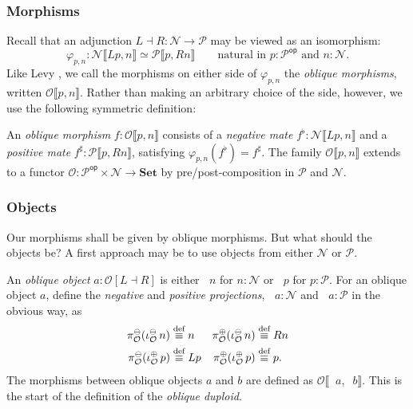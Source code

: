 \documentclass[runningheads]{llncs}
\newcommand*\rocqlogo{\usebox{\rocqlogobox}}
\newcommand{\lemmaref}[3]{\href{https://github.com/UniMath/UniMath/blob/94fae0eda57a778cec704bfa73b4ff525c9bc475/#1\#L#2?name=#3}{\rocqlogo}}
\newcommand{\acat}[1]{\mathcal{#1}}
\newcommand{\PP}{\acat{P}}
\newcommand{\NN}{\acat{N}}
\newcommand{\OO}{\acat{O}}
\newcommand{\wkcat}[1]{\mathbf{#1}}
\newcommand{\Setcat}{\wkcat{Set}}
\newcommand{\Obl}[1]{\OO[#1]}
\newcommand{\op}{{\mathsf{op}}}
\newcommand{\morsof}[3]{{#1}\llbracket{#2},{#3}\rrbracket}
\newcommand{\defequiv}{\overset{\mathrm{\textup{def}}}{\equiv}}
\newcommand{\innegO}{\mathop{\iota^{\ominus}_{\OO}}}
\newcommand{\inposO}{\mathop{\iota^{\oplus}_{\OO}}}
\newcommand{\projnegO}{\mathop{\pi^{\ominus}_{\OO}}}
\newcommand{\projposO}{\mathop{\pi^{\oplus}_{\OO}}}
\begin{document}
\subsubsection*{Morphisms}
\label{sec:morphisms}
Recall that an adjunction \(L \dashv R : \NN \to \PP\) may be
viewed as an isomorphism:
\begin{equation*}
\varphi_{p,n} : \morsof\NN{Lp}{n} \simeq \morsof\PP{p}{Rn}
\qquad \text{natural in \(p : \PP^\op\) and \(n : \NN\).} \label{eq:nathomweq}
\end{equation*}
Like Levy \cite{Levy03b}, we call the morphisms on either side of
\(\varphi_{p,n}\) the \emph{oblique morphisms}, written
\(\morsof\OO{p}{n}\). Rather than making an arbitrary choice of the
side, however, we use the following symmetric definition:

\begin{definition}[{\lemmaref{UniMath/CategoryTheory/Nonassociative/Duploids/FromAdjunction/ObliqueMor.v}{46}{oblique\_mor}}]
\label{def:obliquemor}
An \emph{oblique morphism} \(f : \morsof\OO{p}{n}\) consists of a \emph{negative
mate} \(f^\flat : \morsof{\NN}{Lp}{n}\) and a \emph{positive mate}
\(f^\sharp : \morsof{\PP}{p}{Rn}\), satisfying
\(\varphi_{p,n}(f^\flat) = f^\sharp\). The family \(\morsof\OO{p}{n}\)
extends to a functor \(\OO : \PP^\op \times \NN \to \Setcat\) by
pre/post\hyp{}composition in \(\PP\) and \(\NN\).
\end{definition}
\subsubsection*{Objects}
\label{sec:objects}
Our morphisms shall be given by oblique morphisms. But what should the
objects be? A first approach may be to use objects from either \(\NN\)
or \(\PP\).

\begin{definition}[{\lemmaref{UniMath/CategoryTheory/Nonassociative/Duploids/FromAdjunction/Oblique.v}{58}{oblique\_ob}}]
\label{def:oblique-ob}
An \emph{oblique object} \(a : \Obl{L \dashv R}\) is either \(\innegO{n}\)
for \(n : \NN\) or \(\inposO{p}\) for \(p : \PP\). For an oblique
object \(a\), define the \emph{negative} and \emph{positive projections},
\(\projnegO{a} : \NN\) and \(\projposO{a} : \PP\) in the obvious way,
as
\begin{align*}
  \projnegO(\innegO{n}) &\defequiv n & \projposO(\innegO{n}) &\defequiv Rn \\
  \projnegO(\inposO{p}) &\defequiv Lp & \projposO(\inposO{p}) &\defequiv p\mathpunct.
\end{align*}
The morphisms between oblique objects \(a\) and \(b\) are defined as
\(\morsof\OO{\projposO{a}}{\projnegO{b}}\). This is the start of the
definition of the \emph{oblique duploid}.
\end{definition}
\end{document}
